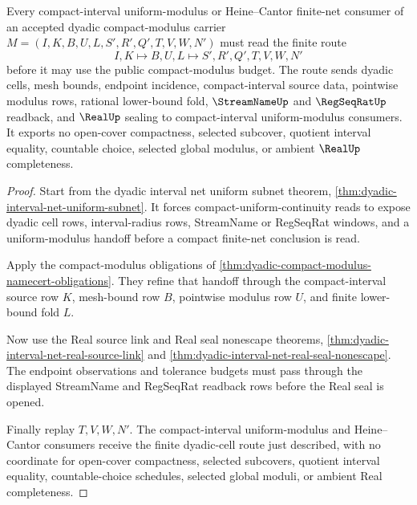 \begin{theorem}
\label{thm:dyadic-compact-modulus-heine-cantor-route}
Every compact-interval uniform-modulus or Heine--Cantor finite-net consumer of an accepted dyadic compact-modulus carrier $M=(I,K,B,U,L,S',R',Q',T,V,W,N')$ must read the finite route
$$
I,K \longmapsto B,U,L \longmapsto S',R',Q',T,V,W,N'
$$
before it may use the public compact-modulus budget. The route sends dyadic cells, mesh bounds, endpoint incidence, compact-interval source data, pointwise modulus rows, rational lower-bound fold, $\StreamNameUp$ and $\RegSeqRatUp$ readback, and $\RealUp$ sealing to compact-interval uniform-modulus consumers. It exports no open-cover compactness, selected subcover, quotient interval equality, countable choice, selected global modulus, or ambient $\RealUp$ completeness.
\end{theorem}
\begin{proof}
Start from the dyadic interval net uniform subnet theorem, \autoref{thm:dyadic-interval-net-uniform-subnet}. It forces compact-uniform-continuity reads to expose dyadic cell rows, interval-radius rows, StreamName or RegSeqRat windows, and a uniform-modulus handoff before a compact finite-net conclusion is read.

Apply the compact-modulus obligations of \autoref{thm:dyadic-compact-modulus-namecert-obligations}. They refine that handoff through the compact-interval source row $K$, mesh-bound row $B$, pointwise modulus row $U$, and finite lower-bound fold $L$.

Now use the Real source link and Real seal nonescape theorems, \autoref{thm:dyadic-interval-net-real-source-link} and \autoref{thm:dyadic-interval-net-real-seal-nonescape}. The endpoint observations and tolerance budgets must pass through the displayed StreamName and RegSeqRat readback rows before the Real seal is opened.

Finally replay $T,V,W,N'$. The compact-interval uniform-modulus and Heine--Cantor consumers receive the finite dyadic-cell route just described, with no coordinate for open-cover compactness, selected subcovers, quotient interval equality, countable-choice schedules, selected global moduli, or ambient Real completeness.
\end{proof}

